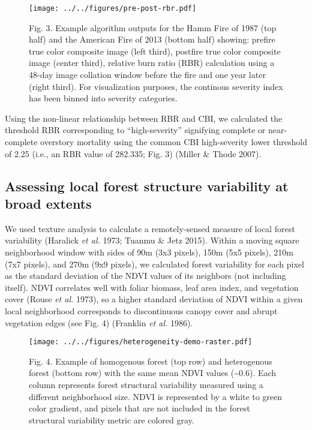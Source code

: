 \documentclass[]{article}
\begin{document}
\begin{figure}
\centering
\texttt{[image: ../../figures/pre-post-rbr.pdf]}
\caption{Fig. 3. Example algorithm outputs for the Hamm Fire of 1987
(top half) and the American Fire of 2013 (bottom half) showing: prefire
true color composite image (left third), postfire true color composite
image (center third), relative burn ratio (RBR) calculation using a
48-day image collation window before the fire and one year later (right
third). For visualization purposes, the continous severity index has
been binned into severity categories.}
\end{figure}

Using the non-linear relationship between RBR and CBI, we calculated the
threshold RBR corresponding to ``high-severity'' signifying complete or
near-complete overstory mortality using the common CBI high-severity
lower threshold of 2.25 (i.e., an RBR value of 282.335; Fig. 3) (Miller
\& Thode 2007).

\hypertarget{assessing-local-forest-structure-variability-at-broad-extents}{%
\subsection{Assessing local forest structure variability at broad
extents}\label{assessing-local-forest-structure-variability-at-broad-extents}}

We used texture analysis to calculate a remotely-sensed measure of local
forest variability (Haralick \emph{et al.} 1973; Tuanmu \& Jetz 2015).
Within a moving square neighborhood window with sides of 90m (3x3
pixels), 150m (5x5 pixels), 210m (7x7 pixels), and 270m (9x9 pixels), we
calculated forest variability for each pixel as the standard deviation
of the NDVI values of its neighbors (not including itself). NDVI
correlates well with foliar biomass, leaf area index, and vegetation
cover (Rouse \emph{et al.} 1973), so a higher standard deviation of NDVI
within a given local neighborhood corresponds to discontinuous canopy
cover and abrupt vegetation edges (see Fig. 4) (Franklin \emph{et al.}
1986).

\begin{figure}
\centering
\texttt{[image: ../../figures/heterogeneity-demo-raster.pdf]}
\caption{Fig. 4. Example of homogenous forest (top row) and heterogenous
forest (bottom row) with the same mean NDVI values
(\textasciitilde{}0.6). Each column represents forest structural
variability measured using a different neighborhood size. NDVI is
represented by a white to green color gradient, and pixels that are not
included in the forest structural variability metric are colored gray.}
\end{figure}
\end{document}
